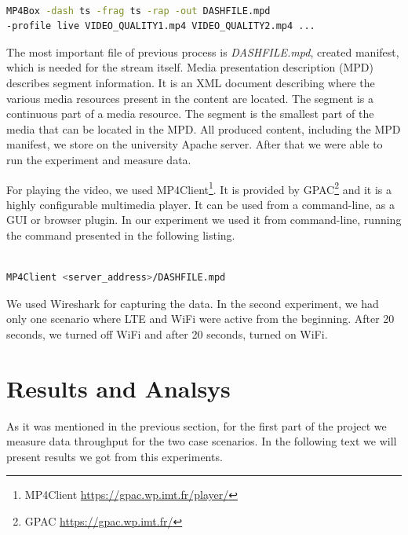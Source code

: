 \documentclass{llncs}
\begin{document}
\begin{lstlisting}[language=bash, caption={\label{l:command}Command for dashyfing content using MP4Box.}, captionpos=b]

MP4Box -dash ts -frag ts -rap -out DASHFILE.mpd 
-profile live VIDEO_QUALITY1.mp4 VIDEO_QUALITY2.mp4 ...
\end{lstlisting} 

The most important file of previous process is \emph{DASHFILE.mpd}, created manifest, which is needed for the stream itself. Media presentation description (MPD) describes segment information. It is an XML document describing where the various media resources present in the content are located. The segment is  a continuous part of a media resource. The segment is the smallest part of the media that can be located in the MPD. All produced content, including the MPD manifest, we store on the university Apache server. After that we were able to run the experiment and measure data.

For playing the video, we used MP4Client\footnote{MP4Client \url{https://gpac.wp.imt.fr/player/}}. It is provided by GPAC\footnote{GPAC \url{https://gpac.wp.imt.fr/}} and it is a highly configurable multimedia player. It can be used from a command-line, as a GUI or browser plugin. In our experiment we used it from command-line, running the command presented in the following listing.

\begin{lstlisting}[language=bash, caption={\label{l:cmd}Command for running MP4Client player.}, captionpos=b]

MP4Client <server_address>/DASHFILE.mpd

\end{lstlisting} 

We used Wireshark for capturing the data. In the second experiment, we had only one scenario where LTE and WiFi were active from the beginning. After 20 seconds, we turned off WiFi and after 20 seconds, turned on WiFi. 

\section{Results and Analsys}
As it was mentioned in the previous section, for the first part of the project we measure data throughput for the two case scenarios. In the following text we will present results we got from this experiments.
\end{document}
